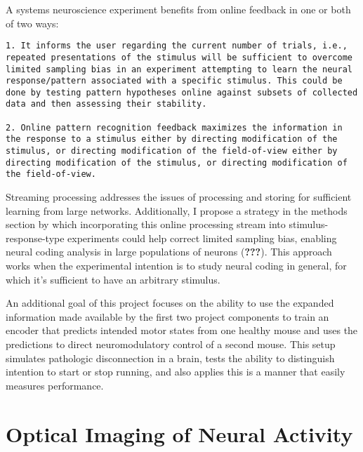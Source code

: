 \documentclass[
  12pt,
  lettersizepaper,
]{book}
\begin{document}
A systems neuroscience experiment benefits from online feedback in one
or both of two ways:

\begin{verbatim}
1. It informs the user regarding the current number of trials, i.e., repeated presentations of the stimulus will be sufficient to overcome limited sampling bias in an experiment attempting to learn the neural response/pattern associated with a specific stimulus. This could be done by testing pattern hypotheses online against subsets of collected data and then assessing their stability.

2. Online pattern recognition feedback maximizes the information in the response to a stimulus either by directing modification of the stimulus, or directing modification of the field-of-view either by directing modification of the stimulus, or directing modification of the field-of-view.
\end{verbatim}

Streaming processing addresses the issues of processing and storing for
sufficient learning from large networks. Additionally, I propose a
strategy in the methods section by which incorporating this online
processing stream into stimulus-response-type experiments could help
correct limited sampling bias, enabling neural coding analysis in large
populations of neurons ({\textbf{???}}). This approach works when the
experimental intention is to study neural coding in general, for which
it's sufficient to have an arbitrary stimulus.

An additional goal of this project focuses on the ability to use the
expanded information made available by the first two project components
to train an encoder that predicts intended motor states from one healthy
mouse and uses the predictions to direct neuromodulatory control of a
second mouse. This setup simulates pathologic disconnection in a brain,
tests the ability to distinguish intention to start or stop running, and
also applies this is a manner that easily measures performance.

\hypertarget{sec:optical-imaging-of-neural-activity}{%
\section{Optical Imaging of Neural
Activity}\label{sec:optical-imaging-of-neural-activity}}
\end{document}
